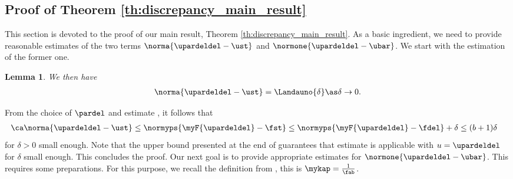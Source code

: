 \documentclass[10pt]{article}
\newtheorem{lemma}[theorem]{Lemma}
\theoremstyle{definition}
\begin{document}
\subsection{Proof of Theorem \ref{th:discrepancy_main_result}}
\label{proof_main:theorem}
This section is devoted to the proof of our main result, Theorem \ref{th:discrepancy_main_result}.
As a basic ingredient, we need to provide
reasonable estimates of the two terms
$ \norma{\upardeldel - \ust } $ and
$ \normone{\upardeldel - \ubar } $.
We start with the estimation of the former one.
%
\begin{lemma}
\label{th:upardel_norma_lemma}
\mainassump
We then have
%
\begin{align*}
\norma{\upardeldel - \ust } = \Landauno{\delta} \as \delta \to 0.
\end{align*}
\end{lemma}
%
\proof  From the choice of $ \pardel$ and estimate
, it follows that
%
\begin{align}
\label{eq:upardel_norma_lemma}
& \ca \norma{\upardeldel -\ust} \le \normyps{\myF{\upardeldel} - \fst } \le
\normyps{\myF{\upardeldel} - \fdel } + \delta \le (b+1)\delta
\end{align}
%
for $ \delta > 0 $ small enough. Note that the upper bound presented at the end of
 guarantees that
estimate  is applicable with $ u = \upardeldel $
for $ \delta $ small enough. This concludes the proof.
\proofend
Our next goal is to provide appropriate estimates for
$ \normone{\upardeldel - \ubar } $. This requires some preparations.
%
For this purpose, we recall the definition from ,
this is
$ \mykap = \frac{1}{\fab} $.
%
%
%
\end{document}
